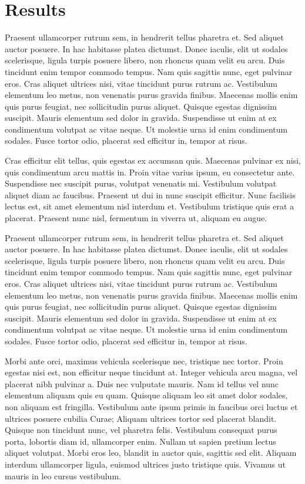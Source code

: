 \documentclass[OGEO,XML,SOM,NoBabelFrench,Unicode,twocolumn,review]{cedram}
\begin{document}
    \section{Results}
    
        Praesent ullamcorper rutrum sem, in hendrerit tellus pharetra et. Sed aliquet auctor posuere. In hac habitasse platea dictumst. Donec iaculis, elit ut sodales scelerisque, ligula turpis posuere libero, non rhoncus quam velit eu arcu. Duis tincidunt enim tempor commodo tempus. Nam quis sagittis nunc, eget pulvinar eros. Cras aliquet ultrices nisi, vitae tincidunt purus rutrum ac. Vestibulum elementum leo metus, non venenatis purus gravida finibus. Maecenas mollis enim quis purus feugiat, nec sollicitudin purus aliquet. Quisque egestas dignissim suscipit. Mauris elementum sed dolor in gravida. Suspendisse ut enim at ex condimentum volutpat ac vitae neque. Ut molestie urna id enim condimentum sodales. Fusce tortor odio, placerat sed efficitur in, tempor at risus.
    
        Cras efficitur elit tellus, quis egestas ex accumsan quis. Maecenas pulvinar ex nisi, quis condimentum arcu mattis in. Proin vitae varius ipsum, eu consectetur ante. Suspendisse nec suscipit purus, volutpat venenatis mi. Vestibulum volutpat aliquet diam ac faucibus. Praesent ut dui in nunc suscipit efficitur. Nunc facilisis lectus est, sit amet elementum nisl interdum et. Vestibulum tristique quis erat a placerat. Praesent nunc nisl, fermentum in viverra ut, aliquam eu augue.
    
        Praesent ullamcorper rutrum sem, in hendrerit tellus pharetra et. Sed aliquet auctor posuere. In hac habitasse platea dictumst. Donec iaculis, elit ut sodales scelerisque, ligula turpis posuere libero, non rhoncus quam velit eu arcu. Duis tincidunt enim tempor commodo tempus. Nam quis sagittis nunc, eget pulvinar eros. Cras aliquet ultrices nisi, vitae tincidunt purus rutrum ac. Vestibulum elementum leo metus, non venenatis purus gravida finibus. Maecenas mollis enim quis purus feugiat, nec sollicitudin purus aliquet. Quisque egestas dignissim suscipit. Mauris elementum sed dolor in gravida. Suspendisse ut enim at ex condimentum volutpat ac vitae neque. Ut molestie urna id enim condimentum sodales. Fusce tortor odio, placerat sed efficitur in, tempor at risus.
    
        Morbi ante orci, maximus vehicula scelerisque nec, tristique nec tortor. Proin egestas nisi est, non efficitur neque tincidunt at. Integer vehicula arcu magna, vel placerat nibh pulvinar a. Duis nec vulputate mauris. Nam id tellus vel nunc elementum aliquam quis eu quam. Quisque aliquam leo sit amet dolor sodales, non aliquam est fringilla. Vestibulum ante ipsum primis in faucibus orci luctus et ultrices posuere cubilia Curae; Aliquam ultrices tortor sed placerat blandit. Quisque non tincidunt nunc, vel pharetra felis. Vestibulum consequat purus porta, lobortis diam id, ullamcorper enim. Nullam ut sapien pretium lectus aliquet volutpat. Morbi eros leo, blandit in auctor quis, sagittis sed elit. Aliquam interdum ullamcorper ligula, euismod ultrices justo tristique quis. Vivamus ut mauris in leo cursus vestibulum.
        
\end{document}
